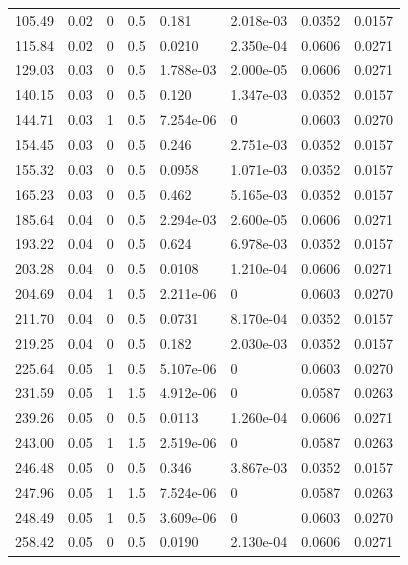 \documentclass[preview]{standalone}
\begin{document}
{{\begin{tabular}{L{1.2cm}C{1.2cm} C{0.3cm}C{0.5cm} C{1.4cm}C{1.4cm} C{1.4cm}C{1.4cm}}
  105.49  &  0.02  & 0     & 0.5 &  0.181  & 2.018e-03  & 0.0352 &  0.0157   \\ 
  115.84  &  0.02  & 0     & 0.5 &  0.0210  & 2.350e-04  & 0.0606 &  0.0271   \\ 
  129.03  &  0.03  & 0     & 0.5 &  1.788e-03  & 2.000e-05  & 0.0606 &  0.0271   \\ 
  140.15  &  0.03  & 0     & 0.5 &  0.120  & 1.347e-03  & 0.0352 &  0.0157   \\ 
  144.71  &  0.03  & 1     & 0.5 &  7.254e-06  & 0  & 0.0603 &  0.0270   \\ 
  154.45  &  0.03  & 0     & 0.5 &  0.246  & 2.751e-03  & 0.0352 &  0.0157   \\ 
  155.32  &  0.03  & 0     & 0.5 &  0.0958  & 1.071e-03  & 0.0352 &  0.0157   \\ 
  165.23  &  0.03  & 0     & 0.5 &  0.462  & 5.165e-03  & 0.0352 &  0.0157   \\ 
  185.64  &  0.04  & 0     & 0.5 &  2.294e-03  & 2.600e-05  & 0.0606 &  0.0271   \\ 
  193.22  &  0.04  & 0     & 0.5 &  0.624  & 6.978e-03  & 0.0352 &  0.0157   \\ 
  203.28  &  0.04  & 0     & 0.5 &  0.0108  & 1.210e-04  & 0.0606 &  0.0271   \\ 
  204.69  &  0.04  & 1     & 0.5 &  2.211e-06  & 0  & 0.0603 &  0.0270   \\ 
  211.70  &  0.04  & 0     & 0.5 &  0.0731  & 8.170e-04  & 0.0352 &  0.0157   \\ 
  219.25  &  0.04  & 0     & 0.5 &  0.182  & 2.030e-03  & 0.0352 &  0.0157   \\ 
  225.64  &  0.05  & 1     & 0.5 &  5.107e-06  & 0  & 0.0603 &  0.0270   \\ 
  231.59  &  0.05  & 1     & 1.5 &  4.912e-06  & 0  & 0.0587 &  0.0263   \\ 
  239.26  &  0.05  & 0     & 0.5 &  0.0113  & 1.260e-04  & 0.0606 &  0.0271   \\ 
  243.00  &  0.05  & 1     & 1.5 &  2.519e-06  & 0  & 0.0587 &  0.0263   \\ 
  246.48  &  0.05  & 0     & 0.5 &  0.346  & 3.867e-03  & 0.0352 &  0.0157   \\ 
  247.96  &  0.05  & 1     & 1.5 &  7.524e-06  & 0  & 0.0587 &  0.0263   \\ 
  248.49  &  0.05  & 1     & 0.5 &  3.609e-06  & 0  & 0.0603 &  0.0270   \\ 
  258.42  &  0.05  & 0     & 0.5 &  0.0190  & 2.130e-04  & 0.0606 &  0.0271   \\ 

\end{tabular}}}
\end{document}
